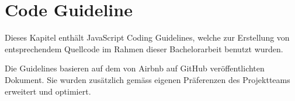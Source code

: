 \chapter{Code Guideline}
\label{sec:code-guideline}
Dieses Kapitel enthält JavaScript Coding Guidelines, welche zur Erstellung von entsprechendem Quellcode im Rahmen dieser Bachelorarbeit benutzt wurden.

Die Guidelines basieren auf dem von Airbnb\cite{Airbnb} auf GitHub veröffentlichten Dokument. Sie wurden zusätzlich gemäss eigenen Präferenzen\cite{JSGL} des Projektteams erweitert und optimiert.

